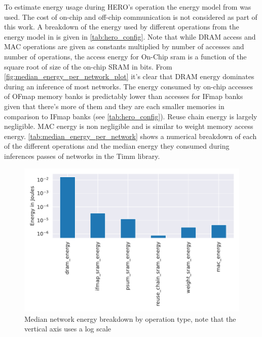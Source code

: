 To estimate energy usage during HERO's operation the energy model from
\cite{area_model} was used. The cost of  on-chip and off-chip communication is
not considered as part of this work. A breakdown of the energy used by different
operations from the energy model in \cite{area_model} is given in
\autoref{tab:hero_config}. Note that while DRAM access and MAC operations are
given as constants multiplied by number of accesses and number of operations,
the access energy for On-Chip sram is a function of the square root of size of
the on-chip SRAM in bits. From \autoref{fig:median_energy_per_network_plot} it's
clear that DRAM energy dominates during an inference of most networks. The
energy consumed by on-chip accesses
of OFmap memory banks is predictably lower than accesses for IFmap banks given
that there's more of them and they are each smaller memories in
comparison to IFmap banks (see \autoref{tab:hero_config}). Reuse chain energy is largely negligible. MAC energy
is non negligible and is similar to weight memory access energy.
\autoref{tab:median_energy_per_network} shows a numerical breakdown of each of
the different operations and the median energy they consumed during inferences
passes of networks in the Timm library. 

\begin{figure}[ht]
    \centering
    \includegraphics[scale=0.58]{Plots/energy/barplot.pdf}
    \caption{Median network energy breakdown by operation type, note that the vertical axis uses a log scale}
    \label{fig:median_energy_per_network_plot}
\end{figure}

